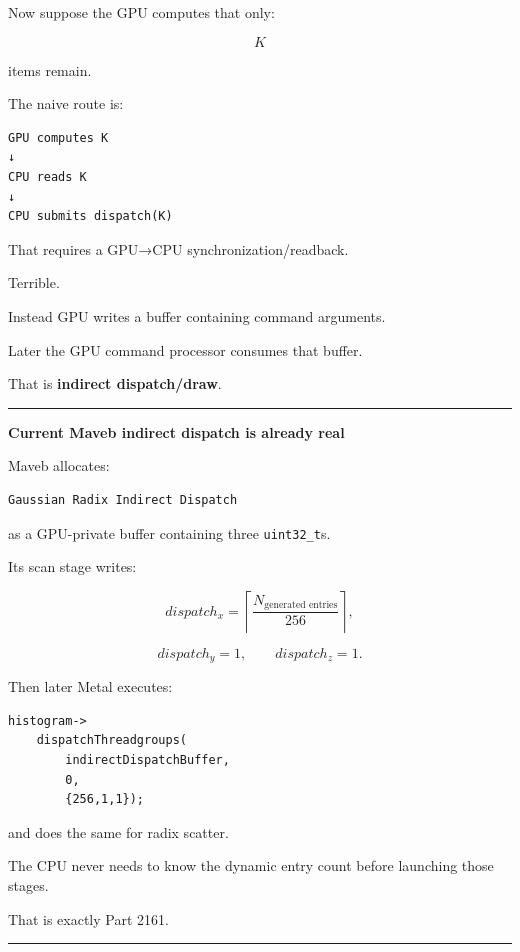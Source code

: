 Now suppose the GPU computes that only:

\[
K
\]

items remain.

The naive route is:

\protect{}\label{p10-bad-readback}%
\begin{verbatim}
GPU computes K
↓
CPU reads K
↓
CPU submits dispatch(K)
\end{verbatim}

That requires a GPU→CPU synchronization/readback.

Terrible.

Instead GPU writes a buffer containing command arguments.

Later the GPU command processor consumes that buffer.

That is \textbf{indirect dispatch/draw}.

\begin{center}\rule{0.5\linewidth}{0.5pt}\end{center}

\textbf{Current Maveb indirect dispatch is already real}

Maveb allocates:

\protect{}\label{p10-indirect-buffer}%
\begin{verbatim}
Gaussian Radix Indirect Dispatch
\end{verbatim}

as a GPU-private buffer containing three \texttt{uint32\_t}s.

Its scan stage writes:

\[
dispatch_x
=
\left\lceil
\frac{
N_{\text{generated entries}}
}{
256
}
\right\rceil,
\]

\[
dispatch_y=1,
\qquad
dispatch_z=1.
\]

Then later Metal executes:

\protect{}\label{p10-indirect-dispatch}%
\begin{verbatim}
histogram->
    dispatchThreadgroups(
        indirectDispatchBuffer,
        0,
        {256,1,1});
\end{verbatim}

and does the same for radix scatter.

The CPU never needs to know the dynamic entry count before launching those stages.

That is exactly Part 2161.

\begin{center}\rule{0.5\linewidth}{0.5pt}\end{center}

